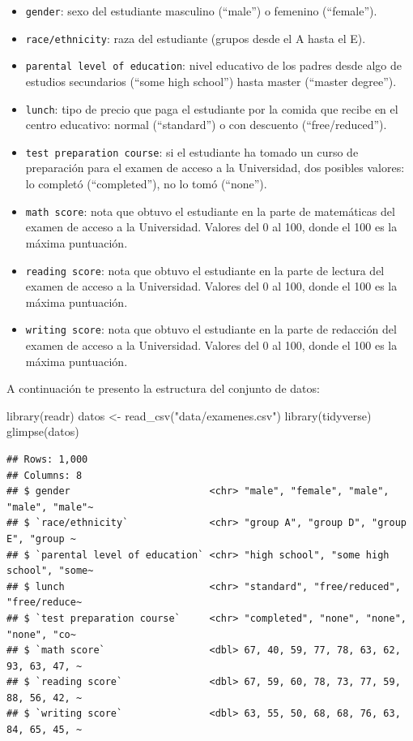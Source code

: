 \documentclass[
]{article}
\newenvironment{Shaded}{\begin{snugshade}}{\end{snugshade}}
\newcommand{\FunctionTok}[1]{\textcolor[rgb]{0.00,0.00,0.00}{#1}}
\newcommand{\NormalTok}[1]{#1}
\newcommand{\OtherTok}[1]{\textcolor[rgb]{0.56,0.35,0.01}{#1}}
\newcommand{\StringTok}[1]{\textcolor[rgb]{0.31,0.60,0.02}{#1}}
\begin{document}
\begin{itemize}
\item
  \texttt{gender}: sexo del estudiante masculino (``male'') o femenino
  (``female'').
\item
  \texttt{race/ethnicity}: raza del estudiante (grupos desde el A hasta
  el E).
\item
  \texttt{parental\ level\ of\ education}: nivel educativo de los padres
  desde algo de estudios secundarios (``some high school'') hasta master
  (``master degree'').
\item
  \texttt{lunch}: tipo de precio que paga el estudiante por la comida
  que recibe en el centro educativo: normal (``standard'') o con
  descuento (``free/reduced'').
\item
  \texttt{test\ preparation\ course}: si el estudiante ha tomado un
  curso de preparación para el examen de acceso a la Universidad, dos
  posibles valores: lo completó (``completed''), no lo tomó (``none'').
\item
  \texttt{math\ score}: nota que obtuvo el estudiante en la parte de
  matemáticas del examen de acceso a la Universidad. Valores del 0 al
  100, donde el 100 es la máxima puntuación.
\item
  \texttt{reading\ score}: nota que obtuvo el estudiante en la parte de
  lectura del examen de acceso a la Universidad. Valores del 0 al 100,
  donde el 100 es la máxima puntuación.
\item
  \texttt{writing\ score}: nota que obtuvo el estudiante en la parte de
  redacción del examen de acceso a la Universidad. Valores del 0 al 100,
  donde el 100 es la máxima puntuación.
\end{itemize}

A continuación te presento la estructura del conjunto de datos:

\begin{Shaded}
\begin{Highlighting}[]
\FunctionTok{library}\NormalTok{(readr)}
\NormalTok{datos }\OtherTok{\textless{}{-}} \FunctionTok{read\_csv}\NormalTok{(}\StringTok{"data/examenes.csv"}\NormalTok{)}
\FunctionTok{library}\NormalTok{(tidyverse)}
\FunctionTok{glimpse}\NormalTok{(datos)}
\end{Highlighting}
\end{Shaded}

\begin{verbatim}
## Rows: 1,000
## Columns: 8
## $ gender                        <chr> "male", "female", "male", "male", "male"~
## $ `race/ethnicity`              <chr> "group A", "group D", "group E", "group ~
## $ `parental level of education` <chr> "high school", "some high school", "some~
## $ lunch                         <chr> "standard", "free/reduced", "free/reduce~
## $ `test preparation course`     <chr> "completed", "none", "none", "none", "co~
## $ `math score`                  <dbl> 67, 40, 59, 77, 78, 63, 62, 93, 63, 47, ~
## $ `reading score`               <dbl> 67, 59, 60, 78, 73, 77, 59, 88, 56, 42, ~
## $ `writing score`               <dbl> 63, 55, 50, 68, 68, 76, 63, 84, 65, 45, ~
\end{verbatim}
\end{document}
